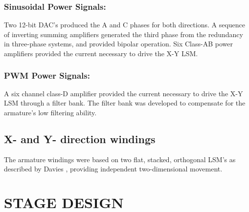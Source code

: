 \documentclass[10pt,twocolumn]{witseiepaper}
\begin{document}
\subsubsection*{Sinusoidal Power Signals:}
Two 12-bit DAC's produced the A and C phases for both directions.  A sequence
of inverting summing amplifiers generated the third phase from the redundancy
in three-phase systems, and provided bipolar operation.  Six Class-AB power
amplifiers provided the current necessary to drive the X-Y LSM.

\subsubsection*{PWM Power Signals:}
A six channel class-D amplifier provided the current necessary to drive the
X-Y LSM through a filter bank. The filter bank was developed to compensate for
the armature's low filtering ability.

\subsection{X- and Y- direction windings}

The armature windings were based on two flat, stacked, orthogonal LSM's as
described by Davies \cite{Simon}, providing independent two-dimensional
movement.

\section{STAGE DESIGN}
\end{document}
